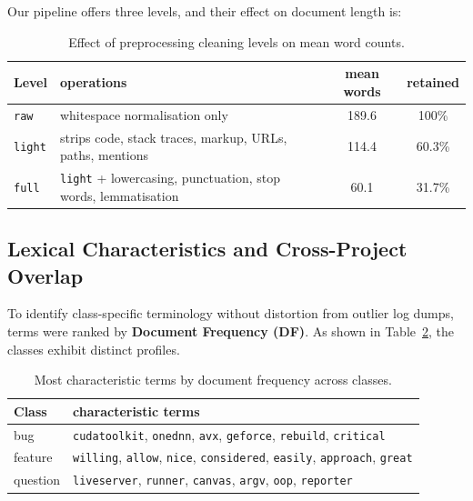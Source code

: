 Our pipeline offers three levels, and their effect on document length is:

\begin{table}[h]
\centering
\caption{Effect of preprocessing cleaning levels on mean word counts.}
\label{tab:preprocessing_levels}
\vspace{0.5em}
\begin{tabular}{l l c c}
\hline
Level & operations & mean words & retained \\
\hline
\texttt{raw} & whitespace normalisation only & 189.6 & 100\% \\
\texttt{light} & strips code, stack traces, markup, URLs, paths, mentions & 114.4 & 60.3\% \\
\texttt{full} & \texttt{light} + lowercasing, punctuation, stop words, lemmatisation & 60.1 & 31.7\% \\
\hline
\end{tabular}
\end{table}

\subsection{Lexical Characteristics and Cross-Project Overlap}


To identify class-specific terminology without distortion from outlier log dumps, terms were ranked by \textbf{Document Frequency (DF)}. As shown in Table~\ref{tab:characteristic_terms}, the classes exhibit distinct profiles.

\begin{table}[h]
\centering
\caption{Most characteristic terms by document frequency across classes.}
\label{tab:characteristic_terms}
\vspace{0.5em}
\begin{tabular}{l p{10cm}}
\hline
Class & characteristic terms \\
\hline
bug & \texttt{cudatoolkit}, \texttt{onednn}, \texttt{avx}, \texttt{geforce}, \texttt{rebuild}, \texttt{critical} \\
feature & \texttt{willing}, \texttt{allow}, \texttt{nice}, \texttt{considered}, \texttt{easily}, \texttt{approach}, \texttt{great} \\
question & \texttt{liveserver}, \texttt{runner}, \texttt{canvas}, \texttt{argv}, \texttt{oop}, \texttt{reporter} \\
\hline
\end{tabular}
\end{table}

